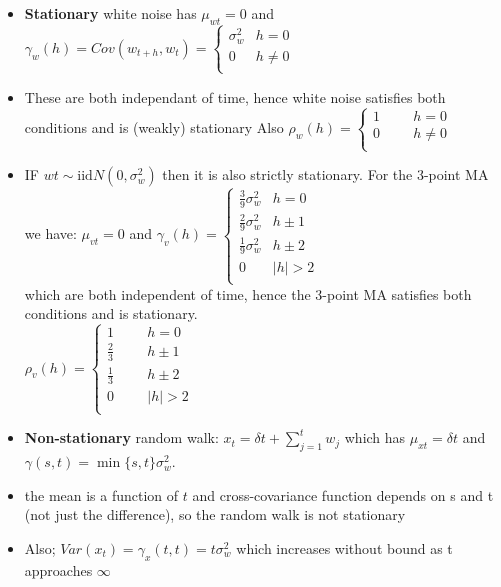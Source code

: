 \documentclass{article}
\begin{document}
\begin{itemize}
    \item \textbf{Stationary} white noise has $\mu_{wt} = 0$ and $\gamma_w(h) = Cov(w_{t+h},w_t) = \begin{cases}
        \sigma^2_w & h=0\\
        0 & h \neq 0\\
    \end{cases}$
    \item These are both independant of time, hence white noise satisfies both conditions and is (weakly) stationary
    \subitem Also $\rho_w(h) = \begin{cases}
        1 \hspace{1cm} h = 0\\
        0 \hspace{1cm} h \neq 0\\
    \end{cases}$
    \item IF $wt \sim \text{iid}N(0,\sigma^2_w)$ then it is also strictly stationary. For the 3-point MA we have:
    \subitem $\mu_{vt} = 0$ and $\gamma_v(h) = \begin{cases}
        \frac{3}{9}\sigma^2_w & h = 0\\
        \frac{2}{9}\sigma^2_w & h \pm 1\\
        \frac{1}{9}\sigma^2_w & h \pm 2\\
        0 & |h| > 2\\
    \end{cases}$\\
    which are both independent of time, hence the 3-point MA satisfies both conditions and is stationary.\\
    $\rho_v(h) = \begin{cases}
    1 \hspace{1cm} h = 0\\
    \frac{2}{3} \hspace{1cm} h \pm 1\\
    \frac{1}{3} \hspace{1cm} h \pm 2\\
    0 \hspace{1cm} |h| > 2\\
    \end{cases}$
\end{itemize}
\vspace{1cm}
\begin{itemize}
    \item \textbf{Non-stationary} random walk: $x_t = \delta t + \sum_{j=1}^t w_j$ which has $\mu_{xt} = \delta t$ and $\gamma(s,t) = \min\{s,t\} \sigma^2_w$.
    \item the mean is a function of $t$ and cross-covariance function depends on s and t (not just the difference), so the random walk is not stationary
    \item Also; $Var(x_t) = \gamma_x (t,t) = t \sigma^2_w$ which increases without bound as t approaches $\infty$
\end{itemize}
\end{document}
